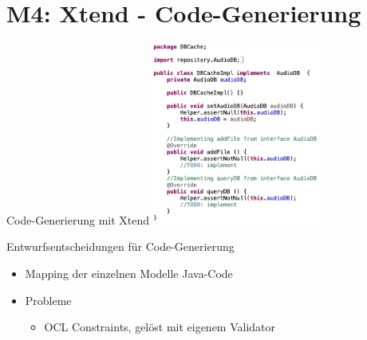 \section[M4: Xtend]{M4: Xtend - Code-Generierung}
\begin{frame}{Code-Generierung mit Xtend}
	\centering
	\includegraphics[height=60mm]{figures/xtend.png}
\end{frame}

\begin{frame}{Entwurfsentscheidungen für Code-Generierung}
	\begin{itemize}
		\item Mapping der einzelnen Modelle Java-Code
		\item Probleme
		\begin{itemize}
            \item OCL Constraints, gelöst mit eigenem Validator
        \end{itemize}
	\end{itemize}
\end{frame}